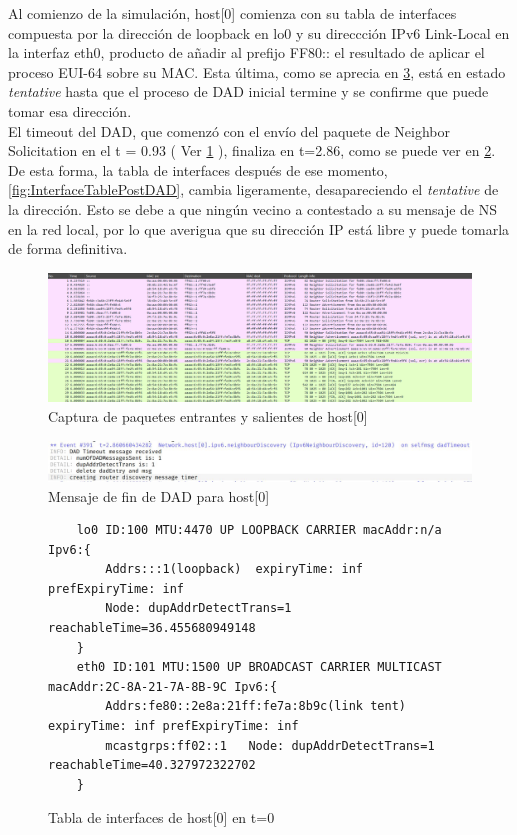 Al comienzo de la simulación, host[0] comienza con su tabla de interfaces compuesta por la dirección de loopback en lo0 y su direccción IPv6 Link-Local en la interfaz eth0, producto de añadir al prefijo FF80:: el resultado de aplicar el proceso EUI-64 sobre su MAC. Esta última, como se aprecia en \ref{fig:InterfaceTableInicial}, está en estado \textit{tentative} hasta que el proceso de DAD inicial termine y se confirme que puede tomar esa dirección. \\
El timeout del DAD, que comenzó con el envío del paquete de Neighbor Solicitation en el t = 0.93 ( Ver \ref{fig:paquetes_IPv6_host0} ), finaliza en t=2.86, como se puede ver en \ref{fig:DAD_host0}. \\
De esta forma, la tabla de interfaces después de ese momento, \ref{fig:InterfaceTablePostDAD}, cambia ligeramente, desapareciendo el \textit{tentative} de la dirección. Esto se debe a que ningún vecino a contestado a su mensaje de NS en la red local, por lo que averigua que su dirección IP está libre y puede tomarla de forma definitiva.

\begin{figure}[H]
    \centering
    \includegraphics[width=135mm, scale=0.75]{imaxes/ejercicio2_4_1.png}
    \caption{Captura de paquetes entrantes y salientes de host[0]}
    \label{fig:paquetes_IPv6_host0}
\end{figure}

\begin{figure}[H]
    \centering
    \includegraphics[width=135mm, scale=0.75]{imaxes/ejercicio2_4_2.png}
    \caption{Mensaje de fin de DAD para host[0]}
    \label{fig:DAD_host0}
\end{figure}

\begin{figure}[H]
    \centering
    \begin{lstlisting}
    lo0 ID:100 MTU:4470 UP LOOPBACK CARRIER macAddr:n/a Ipv6:{
        Addrs:::1(loopback)  expiryTime: inf prefExpiryTime: inf
        Node: dupAddrDetectTrans=1 reachableTime=36.455680949148
    }
    eth0 ID:101 MTU:1500 UP BROADCAST CARRIER MULTICAST macAddr:2C-8A-21-7A-8B-9C Ipv6:{
        Addrs:fe80::2e8a:21ff:fe7a:8b9c(link tent)  expiryTime: inf prefExpiryTime: inf
        mcastgrps:ff02::1 	Node: dupAddrDetectTrans=1 reachableTime=40.327972322702
    }
    \end{lstlisting}
    \caption{Tabla de interfaces de host[0] en t=0}
    \label{fig:InterfaceTableInicial}
\end{figure}

